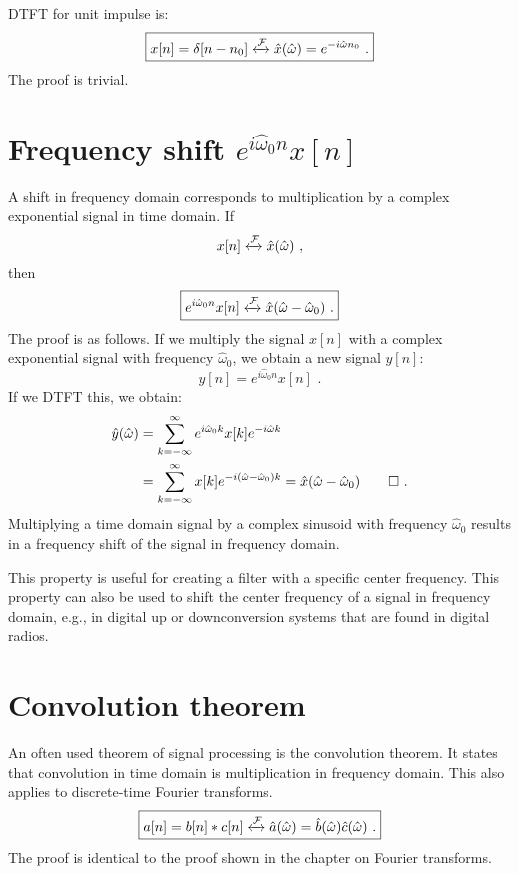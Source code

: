 DTFT for unit impulse is:
\begin{equation}
\boxed{
x[n] = \delta[n-n_0] \xleftrightarrow{\mathcal{F}} \hat{x}(\hat{\omega}) = e^{-i\hat{\omega}n_0}\,\,.
}
\end{equation}
The proof is trivial. 

\section{Frequency shift $e^{i\hat{\omega}_0n}x[n]$}

A shift in frequency domain corresponds to multiplication
by a complex exponential signal in time domain.  If
\begin{equation}
x[n] \xleftrightarrow{\mathcal{F}} \hat{x}(\hat{\omega})\,\,,
\end{equation}
then
\begin{equation}
\boxed{
e^{i\hat{\omega}_0 n}x[n] \xleftrightarrow{\mathcal{F}} \hat{x}(\hat{\omega}-\hat{\omega}_0)\,\,.
}
\end{equation}
The proof is as follows. If we multiply the signal $x[n]$ with a
complex exponential signal with frequency $\hat{\omega}_0$, we obtain a
new signal $y[n]$:
\begin{equation}
y[n] = e^{i\hat{\omega}_0 n}x[n]\,\,. 
\end{equation}
If we DTFT this, we obtain:
\begin{align}
\hat{y}(\hat{\omega})&=\sum_{k=-\infty}^{\infty} e^{i\hat{\omega}_0 k}x[k]e^{-i\hat{\omega}k} \\
&=\sum_{k=-\infty}^{\infty} x[k] e^{-i(\hat{\omega}-\hat{\omega}_0)k} = \hat{x}(\hat{\omega}-\hat{\omega}_0)\qed\,\,.
\end{align}
Multiplying a time domain signal by a complex sinusoid with frequency
$\hat{\omega}_0$ results in a frequency shift of the signal in
frequency domain.

This property is useful for creating a filter with a specific center
frequency. This property can also be used to shift the center
frequency of a signal in frequency domain, e.g., in digital up or
downconversion systems that are found in digital radios.

\section{Convolution theorem}
An often used theorem of signal processing is the convolution theorem. It
states that convolution in time domain is multiplication in frequency
domain. This also applies to discrete-time Fourier transforms.
\begin{equation}
\boxed{
a[n] = b[n]*c[n] \xleftrightarrow{\mathcal{F}} \hat{a}(\hat{\omega}) = \hat{b}(\hat{\omega})\hat{c}(\hat{\omega})\,\,.
}
\end{equation}
The proof is identical to the proof shown in the chapter on Fourier transforms.

